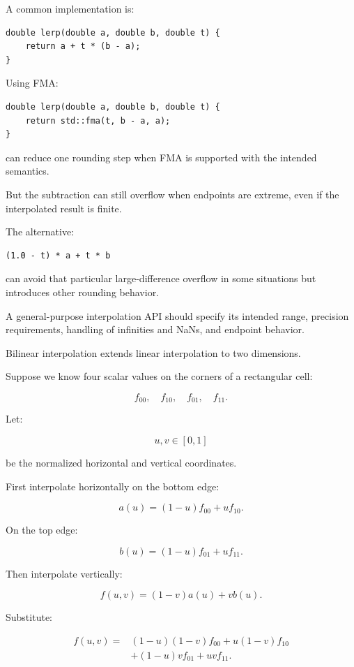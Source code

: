 \hypertarget{02-foundations-ii-ch028-numerically-robust-lerp}{}

A common implementation is:

\begin{verbatim}
double lerp(double a, double b, double t) {
    return a + t * (b - a);
}
\end{verbatim}

Using FMA:

\begin{verbatim}
double lerp(double a, double b, double t) {
    return std::fma(t, b - a, a);
}
\end{verbatim}

can reduce one rounding step when FMA is supported with the intended semantics.

But the subtraction  can still overflow when endpoints are extreme, even if the interpolated result is finite.

The alternative:

\begin{verbatim}
(1.0 - t) * a + t * b
\end{verbatim}

can avoid that particular large-difference overflow in some situations but introduces other rounding behavior.

A general-purpose interpolation API should specify its intended range, precision requirements, handling of infinities and NaNs, and endpoint behavior.

Bilinear interpolation extends linear interpolation to two dimensions.

Suppose we know four scalar values on the corners of a rectangular cell:

\[ f_{00},\quad f_{10},\quad f_{01},\quad f_{11}. \]

Let:

\[ u,v\in[0,1] \]

be the normalized horizontal and vertical coordinates.

First interpolate horizontally on the bottom edge:

\[ a(u)=(1-u)f_{00}+uf_{10}. \]

On the top edge:

\[ b(u)=(1-u)f_{01}+uf_{11}. \]

Then interpolate vertically:

\[ f(u,v)=(1-v)a(u)+vb(u). \]

Substitute:

\[ \boxed{ \begin{aligned} f(u,v)=& (1-u)(1-v)f_{00} +u(1-v)f_{10}\\ &+(1-u)vf_{01} +uvf_{11}. \end{aligned} } \]

